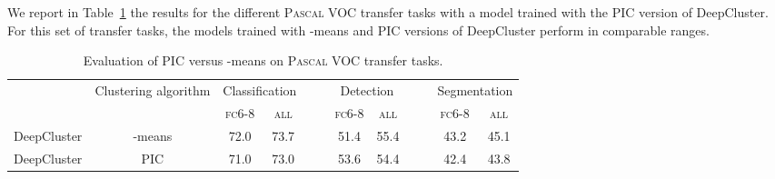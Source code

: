 \documentclass[runningheads]{llncs}
\def\OURS{DeepCluster\xspace}
\begin{document}
We report in Table~\ref{tab:pic} the results for the different \textsc{Pascal} VOC transfer tasks with a model trained with the PIC version of DeepCluster.
For this set of transfer tasks, the models trained with -means and PIC versions of \OURS perform in comparable ranges.

\begin{table}[h!]
  \centering
  \begin{tabular}{@{}l c cc c cc c cc@{}}
    \toprule
                      &Clustering algorithm& \multicolumn{2}{c}{Classification} &~~& \multicolumn{2}{c}{Detection} &~~& \multicolumn{2}{c}{Segmentation} \\
                      \cmidrule{3-4} \cmidrule{6-7} \cmidrule{9-10}
        && \textsc{fc6-8} & \textsc{all}   && \textsc{fc6-8} & \textsc{all}  && \textsc{fc6-8} & \textsc{all} \\
                      \midrule
    \OURS& -means  & 72.0  & 73.7  && 51.4 & 55.4 && 43.2 & 45.1 \\
    \OURS& PIC        & 71.0  & 73.0  && 53.6 & 54.4 && 42.4 & 43.8 \\
    \bottomrule
  \end{tabular}
  \caption{
    Evaluation of PIC versus -means on \textsc{Pascal} VOC transfer tasks.
  }
  \label{tab:pic}
\end{table}
\end{document}
